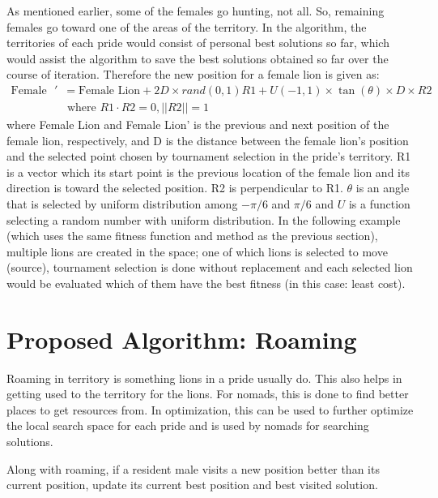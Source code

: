 As mentioned earlier, some of the females go hunting, not all. So, remaining females go toward one of the areas of the territory. In the algorithm, the territories of each pride would consist of personal best solutions so far, which would assist the algorithm to save the best solutions obtained so far over the course of iteration.
Therefore the new position for a female lion is given as:
\begin{align*}
\text{Female Lion}' &= \text{Female Lion} + 2D \times rand(0,1){R1} + U(-1,1) \times \tan(\theta) \times D \times {R2} \\
&\text{  where } R1 \cdot R2 = 0, ||R2|| = 1
\end{align*}
where Female Lion and Female Lion' is the previous and next position of the female lion, respectively, and D is the distance between the female lion's position and the selected point chosen by tournament selection in the pride's territory.
{R1} is a vector which its start point is the previous location of the female lion and its direction is toward the selected position. {R2} is perpendicular to {R1}. $\theta$ is an angle that is selected by uniform distribution among $-\pi/6$ and $\pi/6$ and $U$ is a function selecting a random number with uniform distribution.
In the following example (which uses the same fitness function and method as the previous section), multiple lions are created in the space; one of which lions is selected to move (source), tournament selection is done without replacement and each selected lion would be evaluated which of them have the best fitness (in this case: least cost).


\section{Proposed Algorithm: Roaming}
Roaming in territory is something lions in a pride usually do. This also helps in getting used to the territory for the lions. For nomads, this is done to find better places to get resources from. In optimization, this can be used to further optimize the local search space for each pride and is used by nomads for searching solutions.

Along with roaming, if a resident male visits a new position better than its current position, update its current best position and best visited solution.




